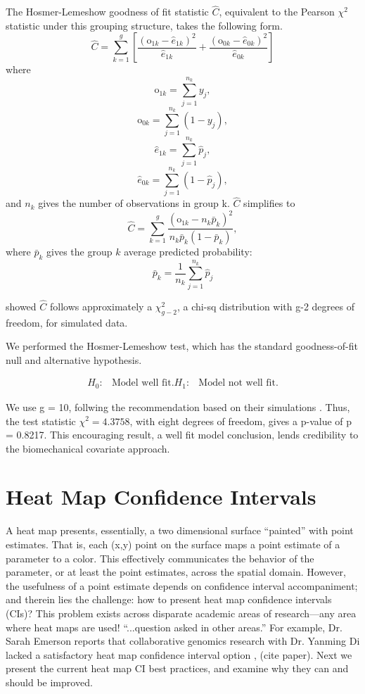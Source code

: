 The Hosmer-Lemeshow goodness of fit statistic $\hat{C}$, equivalent to the Pearson $\chi^{2}$ statistic under this grouping structure, takes the following form.
$$ \widehat{C} = \sum_{k=1}^{g} \left[ \frac{(\text{o}_{1k}-\hat{e}_{1k})^{2}}{\hat{e}_{1k}} + \frac{(\text{o}_{0k}-\hat{e}_{0k})^{2}}{\hat{e}_{0k}}  \right] $$
where
$$ \text{o}_{1k} =  \sum_{j=1}^{n_{k}}y_{j},$$
$$ \text{o}_{0k} =  \sum_{j=1}^{n_{k}}(1-y_{j}),$$
$$ \hat{e}_{1k} = \sum_{j=1}^{n_{k}}\hat{p}_{j},$$
$$ \hat{e}_{0k} = \sum_{j=1}^{n_{k}}(1-\hat{p}_{j}),$$
and $n_{k}$ gives the number of observations in group k. $\widehat{C}$ simplifies to
$$ \widehat{C} = \sum_{k=1}^{g} \frac{(\text{o}_{1k}-n_{k}\bar{p}_{k})^{2}}{n_{k}\bar{p}_{k}(1-\bar{p}_{k})},$$
where $\bar{p}_{k}$ gives the group $k$ average predicted probability:
$$\bar{p}_{k} = \frac{1}{n_{k}}\sum_{j=1}^{n_{k}}\hat{p}_{j}$$

\cite{Hosmer1980} showed $\widehat{C}$ follows approximately a $\chi^{2}_{g-2}$, a chi-sq distribution with g-2 degrees of freedom, for simulated data. 

We performed the Hosmer-Lemeshow test, which has the standard goodness-of-fit null and alternative hypothesis.

\begin{align}
H_{0}: & \text{Model well fit.}
H_{1}: & \text{Model not well fit.}
\end{align}

We use g = 10, follwing the \cite{Hosmer2013} recommendation based on their simulations \cite{Hosmer1980}. Thus, the test statistic $\chi^{2} = 4.3758$, with eight degrees of freedom, gives a p-value of p = 0.8217. This encouraging result, a well fit model conclusion, lends credibility to the biomechanical covariate approach.

\section{Heat Map Confidence Intervals}

A heat map presents, essentially, a two dimensional surface ``painted'' with point estimates. That is, each (x,y) point on the surface maps a point estimate of a parameter to a color. This effectively communicates the behavior of the parameter, or at least the point estimates, across the spatial domain. However, the usefulness of a point estimate depends on confidence interval accompaniment; and therein lies the challenge: how to present heat map confidence intervals (CIs)? This problem exists across disparate academic areas of research---any area where heat maps are used! ``...question asked in other areas.'' For example, Dr. Sarah Emerson reports that collaborative genomics research with Dr. Yanming Di lacked a satisfactory heat map confidence interval option \citep{Emerson}, (cite paper). Next we present the current heat map CI best practices, and examine why they can and should be improved.

